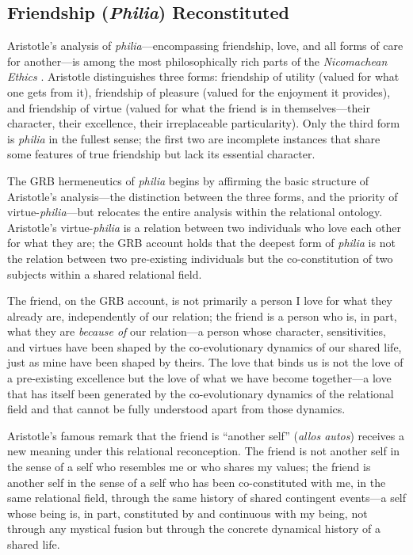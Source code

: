 \subsection{Friendship (\emph{Philia}) Reconstituted}
\label{p14:subsec:philia}

\noindent
Aristotle's analysis of \emph{philia}---encompassing friendship, love, and all forms of care for another---is among the most philosophically rich parts of the \emph{Nicomachean Ethics} \parencite{aristotle2000}. Aristotle distinguishes three forms: friendship of utility (valued for what one gets from it), friendship of pleasure (valued for the enjoyment it provides), and friendship of virtue (valued for what the friend is in themselves---their character, their excellence, their irreplaceable particularity). Only the third form is \emph{philia} in the fullest sense; the first two are incomplete instances that share some features of true friendship but lack its essential character.

The GRB hermeneutics of \emph{philia} begins by affirming the basic structure of Aristotle's analysis---the distinction between the three forms, and the priority of virtue-\emph{philia}---but relocates the entire analysis within the relational ontology. Aristotle's virtue-\emph{philia} is a relation between two individuals who love each other for what they are; the GRB account holds that the deepest form of \emph{philia} is not the relation between two pre-existing individuals but the co-constitution of two subjects within a shared relational field.

The friend, on the GRB account, is not primarily a person I love for what they already are, independently of our relation; the friend is a person who is, in part, what they are \emph{because of} our relation---a person whose character, sensitivities, and virtues have been shaped by the co-evolutionary dynamics of our shared life, just as mine have been shaped by theirs. The love that binds us is not the love of a pre-existing excellence but the love of what we have become together---a love that has itself been generated by the co-evolutionary dynamics of the relational field and that cannot be fully understood apart from those dynamics.

Aristotle's famous remark that the friend is ``another self'' (\emph{allos autos}) receives a new meaning under this relational reconception. The friend is not another self in the sense of a self who resembles me or who shares my values; the friend is another self in the sense of a self who has been co-constituted with me, in the same relational field, through the same history of shared contingent events---a self whose being is, in part, constituted by and continuous with my being, not through any mystical fusion but through the concrete dynamical history of a shared life.

